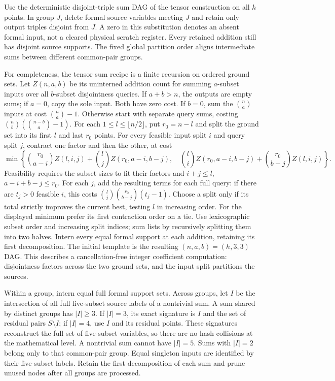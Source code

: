 Use the deterministic disjoint-triple sum DAG of the tensor construction
on all $h$ points. In group $J$, delete formal source variables meeting
$J$ and retain only output triples disjoint from $J$. A zero in this
substitution denotes an absent formal input, not a cleared physical
scratch register. Every retained addition still has disjoint source
supports. The fixed global partition order aligns intermediate sums
between different common-pair groups.

For completeness, the tensor sum recipe is a finite recursion on ordered
ground sets. Let $Z(n,a,b)$ be its uninterned addition count for summing
$a$-subset inputs over all $b$-subset disjointness queries. If $a+b>n$,
the outputs are empty sums; if $a=0$, copy the sole input. Both have
zero cost. If $b=0$, sum the $\binom na$ inputs at cost $\binom na-1$.
Otherwise start with separate query sums, costing
$\binom nb(\binom{n-b}a-1)$. For each $1\le l\le\lfloor n/2\rfloor$,
put $r_0=n-l$ and split the ground set into its first $l$ and last $r_0$
points. For every feasible input split $i$ and query split $j$, contract
one factor and then the other, at cost
\[
 \min\left\{
 \binom{r_0}{a-i}Z(l,i,j)+\binom lj Z(r_0,a-i,b-j),\quad
 \binom li Z(r_0,a-i,b-j)+\binom{r_0}{b-j}Z(l,i,j)
 \right\}.
\]
Feasibility requires the subset sizes to fit their factors and
$i+j\le l$, $a-i+b-j\le r_0$. For each $j$, add the resulting terms
for each full query: if there are $t_j>0$ feasible $i$, this costs
$\binom lj\binom{r_0}{b-j}(t_j-1)$. Choose a split only if its total
strictly improves the current best, testing $l$ in increasing order.
For the displayed minimum prefer its first contraction order on a tie.
Use lexicographic subset order and increasing split indices; sum lists
by recursively splitting them into two halves. Intern every equal formal
support at each addition, retaining its first decomposition. The initial
template is the resulting $(n,a,b)=(h,3,3)$ DAG. This describes a
cancellation-free integer coefficient computation: disjointness factors
across the two ground sets, and the input split partitions the sources.

Within a group, intern equal full formal support sets. Across groups,
let $I$ be the intersection of all full five-subset source labels of a
nontrivial sum. A sum shared by distinct groups has $|I|\ge3$.
If $|I|=3$, its exact signature is $I$ and the set of residual pairs
$S\setminus I$; if $|I|=4$, use $I$ and its residual points. These
signatures reconstruct the full set of five-subset variables, so there
are no hash collisions at the mathematical level. A nontrivial sum
cannot have $|I|=5$. Sums with $|I|=2$ belong only to that common-pair
group. Equal singleton inputs are identified by their five-subset labels.
Retain the first decomposition of each sum and prune unused nodes after
all groups are processed.

